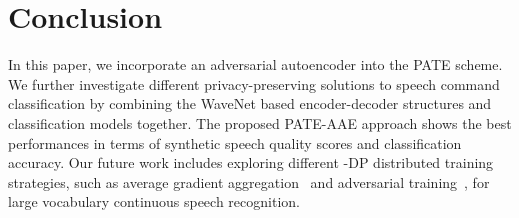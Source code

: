 \documentclass[a4paper]{article}
\begin{document}
\section{Conclusion}
In this paper, we incorporate an adversarial autoencoder into the PATE scheme. We further investigate different privacy-preserving solutions to speech command classification by combining the WaveNet based encoder-decoder structures and classification models together. The proposed PATE-AAE approach shows the best performances in terms of synthetic speech quality scores and classification accuracy. Our future work includes exploring different -DP distributed training strategies, such as average gradient aggregation~\cite{chen2020gs} and adversarial training~\cite{yang2020characterizing}, for large vocabulary continuous speech recognition.

\clearpage



\end{document}
